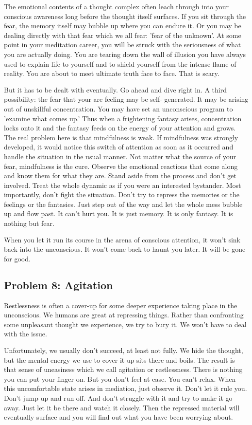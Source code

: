 The emotional contents of a thought complex often leach through into your
conscious awareness long before the thought itself surfaces. If you sit through
the fear, the memory itself may bubble up where you can endure it. Or you may be
dealing directly with that fear which we all fear: 'fear of the unknown'. At
some point in your meditation career, you will be struck with the seriousness of
what you are actually doing. You are tearing down the wall of illusion you have
always used to explain life to yourself and to shield yourself from the intense
flame of reality. You are about to meet ultimate truth face to face. That is
scary.

But it has to be dealt with eventually. Go ahead and dive right in.
A third possibility: the fear that your are feeling may be self- generated. It may be arising out of unskillful concentration. You may
have set an unconscious program to 'examine what comes up.' Thus when a frightening fantasy arises, concentration locks onto it
and the fantasy feeds on the energy of your attention and grows. The real problem here is that mindfulness is weak. If mindfulness
was strongly developed, it would notice this switch of attention as soon as it occurred and handle the situation in the usual
manner. Not matter what the source of your fear, mindfulness is the cure. Observe the emotional reactions that come along and
know them for what they are. Stand aside from the process and don't get involved. Treat the whole dynamic as if you were an
interested bystander. Most importantly, don't fight the situation. Don't try to repress the memories or the feelings or the fantasies.
Just step out of the way and let the whole mess bubble up and flow past. It
can't hurt you. It is just memory. It is only fantasy. It is nothing but fear.

When you let it run its course in the arena of conscious attention, it won't
sink back into the unconscious. It won't come back to haunt you later. It will
be gone for good.

\subsection*{Problem 8: Agitation} Restlessness is often a cover-up for some deeper experience
taking place in the unconscious. We humans are great at repressing things.
Rather than confronting some unpleasant thought we experience, we try to bury
it. We won't have to deal with the issue.

Unfortunately, we usually don't succeed, at least not fully. We hide the
thought, but the mental energy we use to cover it up sits there and boils. The
result is that sense of uneasiness which we call agitation or restlessness.
There is nothing you can put your finger on. But you don't feel at ease. You
can't relax. When this uncomfortable state arises in mediation, just observe it.
Don't let it rule you. Don't jump up and run off. And don't struggle with it and
try to make it go away. Just let it be there and watch it closely. Then the
repressed material will eventually surface and you will find out what you have
been worrying about.

